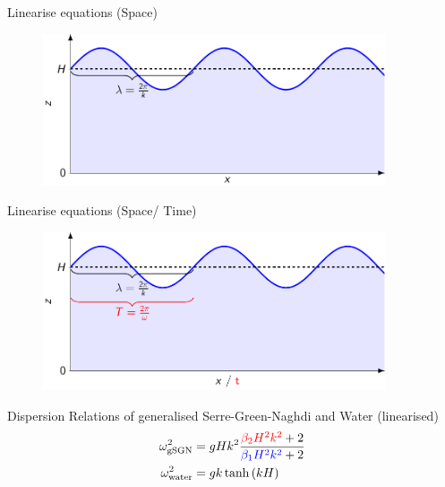 \documentclass[pdf]{beamer}
\begin{document}
    
    
\begin{frame}{Linearise equations (Space)}
\begin{figure}
	\centering
	\includegraphics[width=0.9\textwidth]{./Pics/Tex/Explanatory/DispersionPlot/Dispersion.pdf}
\end{figure}
\end{frame}

\begin{frame}{Linearise equations (Space/ {\color{red} Time})}
\begin{figure}
	\centering
	\includegraphics[width=0.9\textwidth]{./Pics/Tex/Explanatory/DispersionPlot/Dispersion_Analagous.pdf}
\end{figure}
\end{frame}

\begin{frame}{Dispersion Relations of generalised Serre-Green-Naghdi and Water (linearised)}
\begin{align*}
\omega_{\text{gSGN}}^2 & = gH k^2 \dfrac{{\color{red}\beta_2 H^2 k^2} + 2}{ {\color{blue}\beta_1 H^2 k^2} + 2} \\
\omega_{\text{water}}^2 & = gk \tanh\left(kH\right)
\end{align*}
\end{frame}
\end{document}
